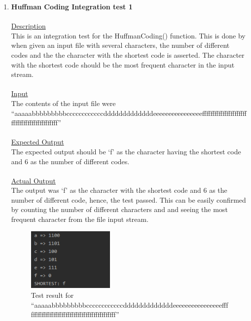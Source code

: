 \documentclass{article}
\newcommand{\quotes}[1]{``#1''}
\begin{document}
\begin{enumerate}
	\item \textbf{Huffman Coding Integration test 1}\\\\
		\underline{Description}\\
		\indent This is an integration test for the HuffmanCoding() function. This is done by when given an input file with several characters, the number of different codes and the the character with the shortest code is asserted. The character with the shortest code should be the most frequent character in the input stream.\\\\
		\underline{Input}\\
		\indent The contents of the input file were \quotes{aaaaabbbbbbbbbccccccccccccdddddddddddddeeeeeeeeeeeeeeeefffffffffffffffffffffffffffffffffffffffffffff}\\	\\
		\underline{Expected Output}\\
		\indent The expected output should be `f' as the character having the shortest code and 6 as the number of different codes.\\\\
		\underline{Actual Output}\\
		The output was `f' as the character with the shortest code and 6 as the number of different code, hence, the test passed. This can be easily confirmed by counting the number of different characters and and seeing the most frequent character from the file input stream.
			\begin{figure}[H]
					\centering
			 			\includegraphics[width=0.4\textwidth]{hctest1.png}
			 			\centering
			  			\caption{Test result for \quotes{aaaaabbbbbbbbbccccccccccccdddddddddddddeeeeeeeeeeeeeeeefffffffffffffffffffffffffffffffffffffffffffff}}
			  			\label{fig:dplltest1}
					\end{figure}
					

\end{enumerate}
\end{document}
